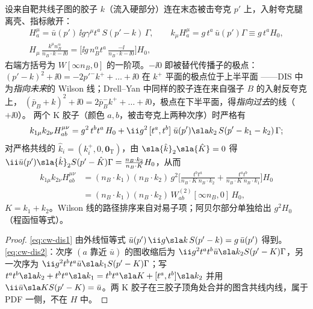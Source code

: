 \begin{proposition}\tagR\label{prop:cw-dis-seed}
设来自靶共线子图的胶子 $k$（流入硬部分）连在末态被击夸克 $p'$ 上，入射夸克腿离壳、指标敞开：
\begin{equation}\label{eq:cw-dis1}
\begin{gathered}
H^\mu_a=\bar u(p')\,\ii g\gamma^\mu t^a\,S(p'-k)\,\Gamma,\qquad k_\mu H^\mu_a=g\,t^a\,\bar u(p')\Gamma\equiv g\,t^aH_0,\\
H_\mu\,\frac{k^\mu n_B^\alpha}{n_B\cdot k-\ii0}=\Big[\ii g\,n_B^\alpha t^a\,\frac{-\ii}{n_B\cdot k-\ii0}\Big]H_0 ,
\end{gathered}
\end{equation}
右端方括号为 $W[\infty n_B,0]$ 的一阶项。$-\ii0$ 即被替代传播子的极点：$(p'-k)^2+\ii0=-2p'^-k^++\dots+\ii0$ 在 $k^+$ 平面的极点位于上半平面
——DIS 中为\emph{指向未来}的 Wilson 线；Drell–Yan 中同样的胶子连在来自强子 $B$ 的入射反夸克上，
$(\bar p_B+k)^2+\ii0=2\bar p_B^-k^++\dots+\ii0$，极点在下半平面，得\emph{指向过去}的线（$+\ii0$）\cite{Collins2002}。
两个 K 胶子（颜色 $a,b$，被击夸克上两种次序）时严格有
\begin{equation}\label{eq:cw-dis2}
k_{1\mu}k_{2\nu}H^{\mu\nu}_{ab}=g^2\,t^bt^a\,H_0+\ii g^2\,[t^a,t^b]\;\bar u(p')\sla k_2\,S(p'-k_1-k_2)\,\Gamma ;
\end{equation}
对严格共线的 $\hat k_i=(k_i^+,0,\bm 0_{\mathrm T})$，由 $\sla{\hat k}_2\sla{\hat K}=0$ 得 $\ii\bar u(p')\sla{\hat k}_2S(p'-\hat K)\Gamma=\frac{n_B\cdot k_2}{n_B\cdot K}H_0$，从而
\begin{equation}\label{eq:cw-dis2c}
\begin{aligned}
k_{1\mu}k_{2\nu}H^{\mu\nu}_{ab}&=(n_B\cdot k_1)(n_B\cdot k_2)\,g^2\Big[\frac{t^bt^a}{n_B\cdot K\;n_B\cdot k_2}+\frac{t^at^b}{n_B\cdot K\;n_B\cdot k_1}\Big]H_0\\
&=(n_B\cdot k_1)(n_B\cdot k_2)\,W^{(2)}_{ab}[\infty n_B,0]\,H_0,
\end{aligned}
\end{equation}
$K=k_1+k_2$。Wilson 线的路径排序来自对易子项；阿贝尔部分单独给出 $g^2H_0$（程函恒等式）。
\end{proposition}

\begin{proof}
\cref{eq:cw-dis1} 由外线恒等式 $\bar u(p')\,\ii g\sla k\,S(p'-k)=g\,\bar u(p')$ 得到。\cref{eq:cw-dis2}：次序 $(a\text{ 靠近 }\bar u)$ 的图收缩后为
$\ii g^2t^at^b\bar u\sla k_2S(p'-K)\Gamma$，另一次序为 $\ii g^2t^bt^a\bar u\sla k_1S(p'-K)\Gamma$；写
$t^at^b\sla k_2+t^bt^a\sla k_1=t^bt^a\sla K+[t^a,t^b]\sla k_2$ 并用 $\ii\bar u\sla KS(p'-K)=\bar u$。两 K 胶子在三胶子顶角处合并的图含共线内线，属于 PDF 一侧，不在 $H$ 中。
\end{proof}


